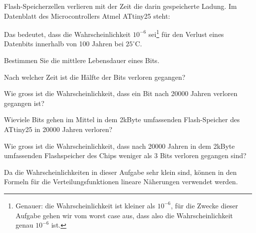 Flash-Speicherzellen verlieren mit der Zeit die darin gespeicherte Ladung.
Im Datenblatt des Microcontrollers Atmel ATtiny25 steht:
\begin{center}
\end{center}
Das bedeutet, dass die
Wahrscheinlichkeit $10^{-6}$ sei\footnote{Genauer: die Wahrscheinlichkeit
ist kleiner als $10^{-6}$, für die Zwecke dieser Aufgabe gehen wir vom
worst case aus, dass also die Wahrscheinlichkeit genau $10^{-6}$ ist.}
für den Verlust eines Datenbits innerhalb
von 100 Jahren bei $25^\circ$C.
\begin{teilaufgaben}
\item Bestimmen Sie die mittlere Lebensdauer eines Bits.
\item Nach welcher Zeit ist die Hälfte der Bits verloren gegangen?
\item Wie gross ist die Wahrscheinlichkeit, dass ein Bit nach 20000
Jahren verloren gegangen ist?
\item Wieviele Bits gehen im Mittel in dem 2kByte umfassenden Flash-Speicher
des ATtiny25 in 20000 Jahren verloren?
\item Wie gross ist die Wahrscheinlichkeit, dass nach 20000 Jahren
in dem 2kByte umfassenden Flash\-speicher des Chips
weniger als 3 Bits verloren gegangen sind?
\end{teilaufgaben}

\begin{hinweis}
Da die Wahrscheinlichkeiten in dieser Aufgabe sehr klein sind, können
in den Formeln für die Verteilungsfunktionen lineare Näherungen
verwendet werden.
\end{hinweis}



